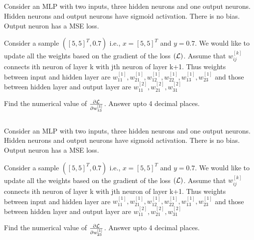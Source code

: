 \begin{frame}
\section{}
Consider an MLP with two inputs, three hidden neurons and one output neurons. Hidden neurons and output neurons have sigmoid activation. There is no bias. Output neuron has a MSE loss.

Consider a sample $([5,5]^T,0.7)$ i.e., $x = [5,5]^T$ and $y=0.7$. We would like to update all the weights based on the gradient of the loss $({\cal L})$. Assume that $w_{ij}^{[k]}$ connects ith neuron of layer k with jth neuron of layer k+1. Thus weights between input and hidden layer are $w_{11}^{[1]}, w_{21}^{[1]}, w_{12}^{[1]}, w_{22}^{[1]}, w_{13}^{[1]}, w_{23}^{[1]}$ and those between hidden layer and output layer are $w_{11}^{[2]}, w_{21}^{[2]}, w_{31}^{[2]}$

Find the numerical value of $\frac{\partial \cal L}{\partial w_{13}^{[1]}}$. Answer upto 4 decimal places.



\end{frame}


\begin{frame}
\section{}
Consider an MLP with two inputs, three hidden neurons and one output neurons. Hidden neurons and output neurons have sigmoid activation. There is no bias. Output neuron has a MSE loss.

Consider a sample $([5,5]^T,0.7)$ i.e., $x = [5,5]^T$ and $y=0.7$. We would like to update all the weights based on the gradient of the loss $({\cal L})$. Assume that $w_{ij}^{[k]}$ connects ith neuron of layer k with jth neuron of layer k+1. Thus weights between input and hidden layer are $w_{11}^{[1]}, w_{21}^{[1]}, w_{12}^{[1]}, w_{22}^{[1]}, w_{13}^{[1]}, w_{23}^{[1]}$ and those between hidden layer and output layer are $w_{11}^{[2]}, w_{21}^{[2]}, w_{31}^{[2]}$

Find the numerical value of $\frac{\partial \cal L}{\partial w_{23}^{[1]}}$. Answer upto 4 decimal places.



\end{frame}


